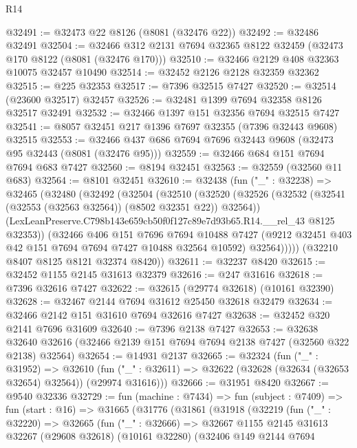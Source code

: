 \begin{lexlean}{R14}
\begin{coremodule}
@32491 := @32473 @22 @8126 (@8081 (@32476 @22))
@32492 := @32486 @32491
@32504 := @32466 @312 @2131 @7694 @32365 @8122 @32459 (@32473 @170 @8122 (@8081 (@32476 @170)))
@32510 := @32466 @2129 @408 @32363 @10075 @32457 @10490
@32514 := @32452 @2126 @2128 @32359 @32362
@32515 := @225 @32353
@32517 := @7396 @32515 @7427
@32520 := @32514 (@23600 @32517) @32457
@32526 := @32481 @1399 @7694 @32358 @8126 @32517 @32491
@32532 := @32466 @1397 @151 @32356 @7694 @32515 @7427
@32541 := @8057 @32451 @217 @1396 @7697 @32355 (@7396 @32443 @9608) @32515
@32553 := @32466 @437 @686 @7694 @7696 @32443 @9608 (@32473 @95 @32443 (@8081 (@32476 @95)))
@32559 := @32466 @684 @151 @7694 @7694 @683 @7427
@32560 := @8194 @32451
@32563 := @32559 (@32560 @11 @683)
@32564 := @8101 @32451
@32610 := @32438
    (fun ("_" : @32238) =>
    @32465
      (@32480
        (@32492
          (@32504
            (@32510
              (@32520
                (@32526 (@32532 (@32541 (@32553 (@32563 @32564)) (@8502 @32351 @22)) @32564))
                (LexLeanPreserve.C798b143e659cb50f0f127c89e7d93b65.R14.__rel_43 @8125 @32353))
              (@32466
                @406
                @151
                @7696
                @7694
                @10488
                @7427
                (@9212 @32451 @403 @42 @151 @7694 @7694 @7427 @10488 @32564 @10592)
                @32564)))))
      (@32210 @8407 @8125 @8121 @32374 @8420))
@32611 := @32237 @8420
@32615 := @32452 @1155 @2145 @31613 @32379
@32616 := @247 @31616
@32618 := @7396 @32616 @7427
@32622 := @32615 (@29774 @32618) (@10161 @32390)
@32628 := @32467 @2144 @7694 @31612 @25450 @32618 @32479
@32634 := @32466 @2142 @151 @31610 @7694 @32616 @7427
@32638 := @32452 @320 @2141 @7696 @31609
@32640 := @7396 @2138 @7427
@32653 := @32638
    @32640
    @32616
    (@32466 @2139 @151 @7694 @7694 @2138 @7427 (@32560 @322 @2138) @32564)
@32654 := @14931 @2137
@32665 := @32324
    (fun ("_" : @31952) =>
    @32610 (fun ("_" : @32611) => @32622 (@32628 (@32634 (@32653 @32654) @32564)) (@29974 @31616)))
@32666 := @31951 @8420
@32667 := @9540 @32336
@32729 := fun (machine : @7434) =>
  fun (subject : @7409) =>
  fun (start : @16) =>
  @31665
    (@31776
      (@31861
        (@31918
          (@32219
            (fun ("_" : @32220) =>
            @32665
              (fun ("_" : @32666) =>
              @32667
                @1155
                @2145
                @31613
                @32267
                (@29608 @32618)
                (@10161 @32280)
                (@32406
                  @149
                  @2144
                  @7694

\end{coremodule}
\end{lexlean}
